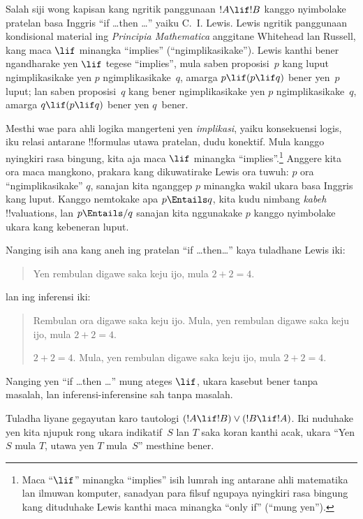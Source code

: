 \documentclass[../../../include/open-logic-section]{subfiles}
\begin{document}


Salah siji wong kapisan kang ngritik panggunaan $!A \lif !B$ kanggo
nyimbolake pratelan basa Inggris ``if \dots then \dots'' yaiku
C.~I. Lewis. Lewis ngritik panggunaan kondisional material ing
\emph{Principia Mathematica} anggitane Whitehead lan Russell, kang
maca $\lif$ minangka ``implies'' (``ngimplikasikake''). Lewis kanthi
bener ngandharake yen $\lif$ tegese ``implies'', mula saben
proposisi~$p$ kang luput ngimplikasikake yen $p$ ngimplikasikake~$q$,
amarga $p \lif (p \lif q)$ bener yen~$p$ luput; lan saben proposisi~$q$
kang bener ngimplikasikake yen $p$ ngimplikasikake~$q$, amarga
$q \lif (p \lif q)$ bener yen $q$~bener.

Mesthi wae para ahli logika mangerteni yen \emph{implikasi}, yaiku
konsekuensi logis, iku relasi antarane !!{formula}s utawa pratelan,
dudu konektif. Mula kanggo nyingkiri rasa bingung, kita aja maca
$\lif$ minangka ``implies''.\footnote{Maca ``$\lif$'' minangka
  ``implies'' isih lumrah ing antarane ahli matematika lan ilmuwan
  komputer, sanadyan para filsuf ngupaya nyingkiri rasa bingung kang
  dituduhake Lewis kanthi maca minangka ``only if'' (``mung yen'').}
Anggere kita ora maca mangkono, prakara kang dikuwatirake Lewis
ora tuwuh: $p$ ora ``ngimplikasikake'' $q$, sanajan kita nganggep
$p$ minangka wakil ukara basa Inggris kang luput. Kanggo nemtokake
apa $p \Entails q$, kita kudu nimbang \emph{kabeh} !!{valuation}s,
lan $p \Entails/ q$ sanajan kita nggunakake $p$ kanggo nyimbolake
ukara kang kebeneran luput.

Nanging isih ana kang aneh ing pratelan ``if \dots then\dots''
kaya tuladhane Lewis iki:
\begin{quote}
Yen rembulan digawe saka keju ijo, mula $2+2=4$.
\end{quote}
lan ing inferensi iki:
\begin{quote}
  Rembulan ora digawe saka keju ijo. Mula, yen rembulan digawe
  saka keju ijo, mula $2+2=4$.

  $2+2 = 4$. Mula, yen rembulan digawe
  saka keju ijo, mula $2+2=4$.
\end{quote}
Nanging yen ``if \dots then \dots'' mung ateges $\lif$, ukara
kasebut bener tanpa masalah, lan inferensi-inferensine sah tanpa
masalah.

Tuladha liyane gegayutan karo tautologi $(!A \lif !B) \lor (!B \lif
!A)$. Iki nuduhake yen kita njupuk rong ukara indikatif~$S$ lan $T$
saka koran kanthi acak, ukara ``Yen $S$ mula $T$, utawa yen $T$
mula~$S$'' mesthine bener.
\end{document}
